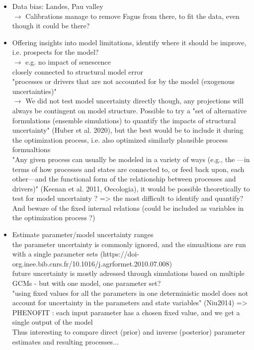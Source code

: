 \documentclass[letterpaper,8pt]{extarticle}  %
\begin{document}
\begin{doublespacing}
\begin{linenumbers}
\begin{itemize}
\item Data bias: Landes, Pau valley \\
$\rightarrow$ Calibrations manage to remove Fagus from there, to fit the data, even though it could be there? \\


\item Offering insights into model limitations, identify where it should be improve, i.e. prospects for the model?\\
$\rightarrow$ e.g. no impact of senescence \\
closely connected to structural model error\\
"processes or drivers that are not accounted for by the model (exogenous uncertainties)"\\
$\rightarrow$ We did not test model uncertainty directly though, any projections will always be contingent on model structure. Possible to try a "set of alternative formulations (ensemble simulations) to quantify the impacts of structural uncertainty" (Huber et al. 2020), but the best would be to include it during the optimization process, i.e. also optimized similarly plausible process formualtions \\
"Any given process can usually be modeled in a variety of ways (e.g., the —in terms of how processes and states are connected to, or feed back upon, each other—and the functional form of the relationship between processes and drivers)" (Keenan et al. 2011, Oecologia), it would be possible theoretically to test for model uncertainty ? => the most difficult to identify and quantify? \\
And beware of the fixed internal relations (could be included as variables in the optimization process ?)

\item Estimate parameter/model uncertainty ranges  \\
the parameter uncertainty is commonly ignored, and the simualtions are run with a single parameter sets (https://doi-org.inee.bib.cnrs.fr/10.1016/j.agrformet.2010.07.008) \\
future uncertainty is mostly adressed through simulations based on multiple GCMs - but with one model, one parameter set? \\
"using fixed values for all the parameters in one deterministic model does not account for uncertainty in the parameters and state variables" (Niu2014) => PHENOFIT : each input parameter has a chosen fixed value, and we get a single output of the model \\
Thus interesting to compare direct (prior) and inverse (posterior) parameter estimates and resulting processes...\\


\end{itemize}
\end{linenumbers}
\end{doublespacing}
\end{document}
